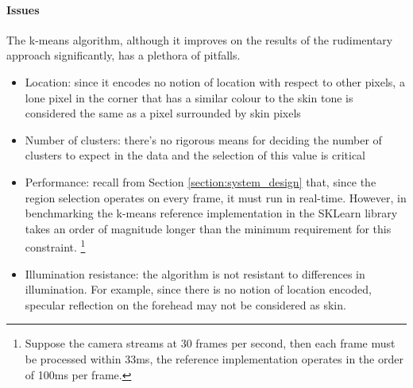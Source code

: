 \paragraph{Issues}




The k-means algorithm, although it improves on the results of the rudimentary approach significantly, has a plethora of pitfalls.
\begin{itemize}
    \item Location: since it encodes no notion of location with respect to other pixels, a lone pixel in the corner that has a similar colour to the skin tone is considered the same as a pixel surrounded by skin pixels
    \item Number of clusters: there's no rigorous means for deciding the number of clusters to expect in the data and the selection of this value is critical 
    \item Performance: recall from Section \ref{section:system_design} that, since the region selection operates on every frame, it must run in real-time. However, in benchmarking the k-means reference implementation in the SKLearn library takes an order of magnitude longer than the minimum requirement for this constraint. \footnote{Suppose the camera streams at 30 frames per second, then each frame must be processed within 33ms, the reference implementation operates in the order of 100ms per frame. }
    \item Illumination resistance: the algorithm is not resistant to differences in illumination. For example, since there is no notion of location encoded, specular reflection on the forehead may not be considered as skin.
\end{itemize}

